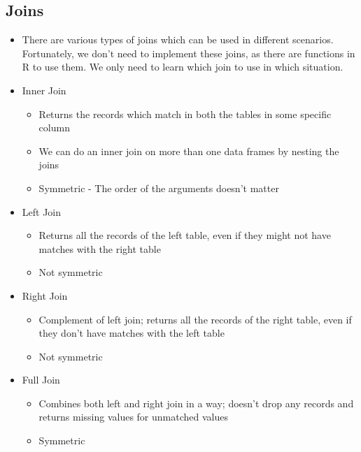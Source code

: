 \documentclass{article}
\begin{document}
\subsection{Joins}
\begin{itemize}
    \item There are various types of joins which can be used in different scenarios. Fortunately, we don't need to implement these joins, as there are functions in R to use them. We only need to learn which join to use in which situation.
        \item Inner Join
        \begin{itemize}
            \item Returns the records which match in both the tables in some specific column
            \item We can do an inner join on more than one data frames by nesting the joins
            \item Symmetric - The order of the arguments doesn't matter
        \end{itemize}
        \item Left Join
        \begin{itemize}
            \item Returns all the records of the left table, even if they might not have matches with the right table
            \item Not symmetric
        \end{itemize}
        \begin{itemize}
        \end{itemize}
        \item Right Join
        \begin{itemize}
            \item Complement of left join; returns all the records of the right table, even if they don't have matches with the left table
            \item Not symmetric
        \end{itemize}
        \begin{itemize}
            
        \end{itemize}
        \item Full Join
        \begin{itemize}
            \item Combines both left and right join in a way; doesn't drop any records and returns missing values for unmatched values
            \item Symmetric
        \end{itemize}
        \begin{itemize}
            

\end{itemize}
\end{itemize}
\end{document}
